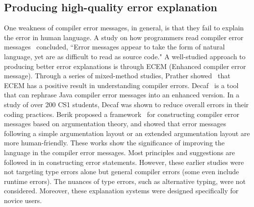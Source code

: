 \subsection{Producing high-quality error explanation}
One weakness of compiler error messages, in general, is that they fail to explain the error in human language. A study on how programmers read compiler error messages~\cite{Barik2017-gy} concluded, ``Error messages appear to take the form of natural language, yet are as difficult to read as source code."  A well-studied approach to producing better error explanations is through ECEM (Enhanced compiler error message). Through a series of mixed-method studies, Prather showed~\cite{Prather2017-dg} that ECEM has a positive result in understanding compiler errors. Decaf~\cite{Becker2016-kc} is a tool that can rephrase Java compiler error messages into an enhanced version. In a study of over 200 CS1 students, Decaf was shown to reduce overall errors in their coding practices. Berik proposed a framework~\cite{Barik2018-xs} for constructing compiler error messages based on argumentation theory, and showed that error messages following a simple argumentation layout or an extended argumentation layout are more human-friendly.  These works show the significance of improving the language in the compiler error messages. Most principles and suggestions are followed in \chameleon{} in constructing error statements. However, these earlier studies were not targeting type errors alone but general compiler errors (some even include runtime errors). The nuances of type errors, such as alternative typing, were not considered. Moreover, these explanation systems were designed specifically for novice users. 





